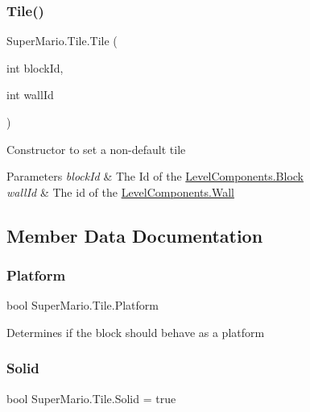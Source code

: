 \subsubsection{\texorpdfstring{Tile()}{Tile()}\hspace{0.1cm}{\footnotesize\ttfamily [2/2]}}
{\footnotesize\ttfamily Super\+Mario.\+Tile.\+Tile (\begin{DoxyParamCaption}\item[{int}]{block\+Id,  }\item[{int}]{wall\+Id }\end{DoxyParamCaption})}



Constructor to set a non-\/default tile 


\begin{DoxyParams}{Parameters}
{\em block\+Id} & The Id of the \mbox{\hyperlink{class_super_mario_1_1_level_components_1_1_block}{Level\+Components.\+Block}}\\
\hline
{\em wall\+Id} & The id of the \mbox{\hyperlink{class_super_mario_1_1_level_components_1_1_wall}{Level\+Components.\+Wall}}\\
\hline
\end{DoxyParams}


\subsection{Member Data Documentation}
\mbox{\label{class_super_mario_1_1_tile_a033ea68f20db786cf3f71d9b3351e523}} 
\subsubsection{\texorpdfstring{Platform}{Platform}}
{\footnotesize\ttfamily bool Super\+Mario.\+Tile.\+Platform}



Determines if the block should behave as a platform 

\mbox{\label{class_super_mario_1_1_tile_a870427fd1ed65b69ae920c863bd46a2c}} 
\subsubsection{\texorpdfstring{Solid}{Solid}}
{\footnotesize\ttfamily bool Super\+Mario.\+Tile.\+Solid = true}



